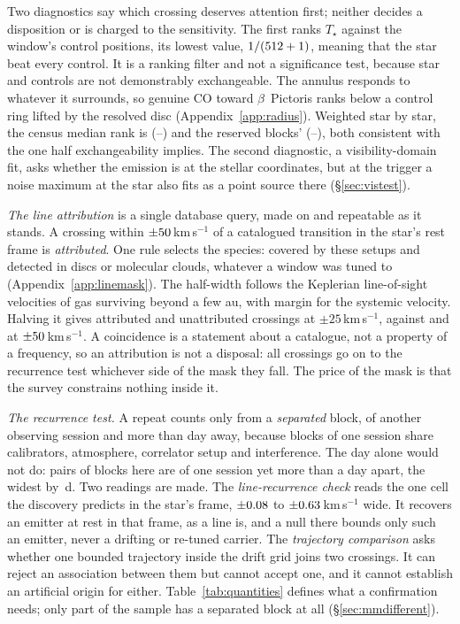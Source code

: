 Two diagnostics say which crossing deserves attention first; neither decides a
disposition or is charged to the sensitivity. The first ranks $T_\star$
against the window's \NCtrl{} control positions, its lowest value,
$1/(512+1)$, meaning that the star beat every control. It is a ranking
filter and not a significance test, because star and controls are not
demonstrably exchangeable. The annulus responds to whatever it surrounds, so
genuine CO toward $\beta$~Pictoris ranks below a control ring lifted by the
resolved disc (Appendix~\ref{app:radius}). Weighted star by star, the census
median rank is \BkRankBalSurv{} (\BkRankBalSurvLo--\BkRankBalSurvHi) and the
reserved blocks' \BkRankBalHo{} (\BkRankBalHoLo--\BkRankBalHoHi), both
consistent with the one half exchangeability implies. The second diagnostic, a
visibility-domain fit, asks whether the emission is at the stellar
coordinates, but at the trigger a noise maximum at the star also fits as a
point source there (\S\ref{sec:vistest}).

\emph{The line attribution} is a single database query, made on \MkListDate{}
and repeatable as it stands. A crossing within $\pm50$\,km\,s$^{-1}$
of a catalogued transition in the star's rest frame is \emph{attributed}. One
rule selects the species: covered by these setups and detected in discs or
molecular clouds, whatever a window was tuned to
(Appendix~\ref{app:linemask}). The half-width follows the Keplerian
line-of-sight velocities of gas surviving beyond a few au, with margin for the
systemic velocity. Halving it gives \FrAttrWTwentyFive{} attributed and
\FrUnattrWTwentyFive{} unattributed crossings at $\pm25$\,km\,s$^{-1}$,
against \FrAttrWFifty{} and \FrUnattrWFifty{} at
$\pm50$\,km\,s$^{-1}$. A coincidence is a statement about a
catalogue, not a property of a frequency, so an attribution is not a disposal:
all \CnCross{} crossings go on to the recurrence test whichever side of the
mask they fall. The price of the mask is that the survey constrains nothing
inside it.

\emph{The recurrence test.} A repeat counts only from a \emph{separated}
block, of another observing session and more than \EpSep{} day away, because
blocks of one session share calibrators, atmosphere, correlator setup and
interference. The day alone would not do: \QfNPairDrop{}
pairs of blocks here are of one session yet more than a day apart, the widest
by \QfSameSessMaxD\,d. Two readings are made. The \emph{line-recurrence check}
reads the one cell the discovery predicts in the star's frame, $\pm0.08$ to
$\pm0.63$\,km\,s$^{-1}$ wide. It recovers an emitter at rest in that frame,
as a line is, and a null there bounds only such an emitter, never a drifting
or re-tuned carrier. The \emph{trajectory comparison} asks whether one bounded
trajectory inside the drift grid joins two crossings. It can reject an
association between them but cannot accept one, and it cannot establish an
artificial origin for either. Table~\ref{tab:quantities} defines what a
confirmation needs; only part of the sample has a separated block at all
(\S\ref{sec:mmdifferent}).

